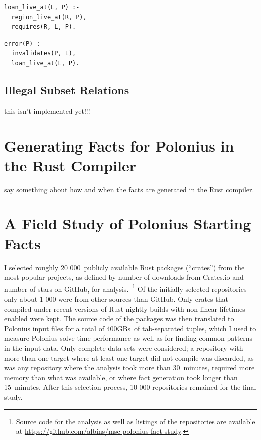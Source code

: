 \documentclass[11pt,a4paper,twoside,openany]{report}
\newcommand{\fixme}[1] {{\color{red}#1}}
\newenvironment{sourcecode}{\captionsetup{type=listing}}{}
\begin{document}
\begin{sourcecode}
  \label{lst:loan-live}
\begin{verbatim}
loan_live_at(L, P) :-
  region_live_at(R, P),
  requires(R, L, P).
\end{verbatim}
\end{sourcecode}

\begin{sourcecode}
  \label{lst:error-invalidates}
\begin{verbatim}
error(P) :-
  invalidates(P, L),
  loan_live_at(L, P).
\end{verbatim}
\end{sourcecode}

\subsection{Illegal Subset Relations}\label{sec:illeg-subs-relat}

\fixme{this isn't implemented yet!!!}

\section{Generating Facts for Polonius in the Rust Compiler}

\fixme{say something about how and when the facts are generated in the Rust
  compiler.}

\section{A Field Study of Polonius Starting Facts}\label{sec:field-study-borrow}

I selected roughly 20 000~publicly available Rust packages (``crates'') from the
most popular projects, as defined by number of downloads from Crates.io and
number of stars on GitHub, for analysis.~\footnote{Source code for the analysis
  as well as listings of the repositories are available at
  \url{https://github.com/albins/msc-polonius-fact-study}.} Of the initially
selected repositories only about 1 000 were from other sources than GitHub. Only
crates that compiled under recent versions of Rust nightly builds with
non-linear lifetimes enabled were kept. The source code of the packages was then
translated to Polonius input files for a total of 400GBs~of tab-separated
tuples, which I used to measure Polonius solve-time performance as well as for
finding common patterns in the input data. Only complete data sets were
considered; a repository with more than one target where at least one target did
not compile was discarded, as was any repository where the analysis took more
than 30~minutes, required more memory than what was available, or where fact
generation took longer than 15~minutes. After this selection process, \fixme{10
  000} repositories remained for the final study.
\end{document}
